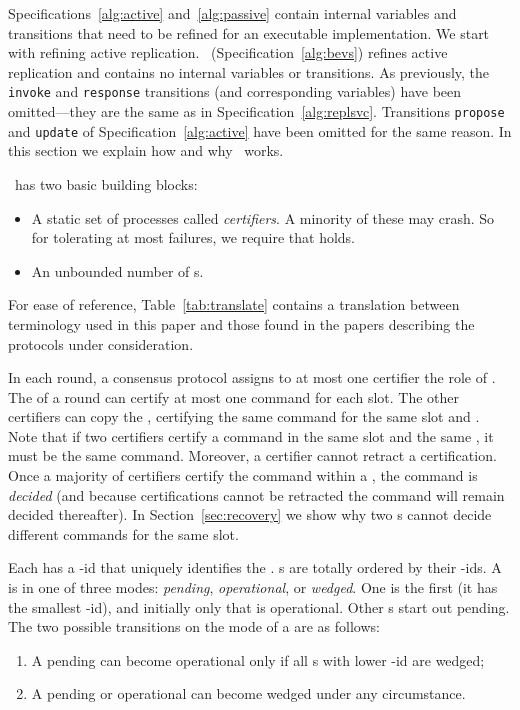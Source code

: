 \label{sec:bevs}

Specifications~\ref{alg:active} and~\ref{alg:passive} contain
internal variables and transitions
that need to be refined for an executable implementation.
We start with refining active replication.
\multiconsensus\
(Specification~\ref{alg:bevs}) refines active replication and contains
no internal variables or transitions.
As previously, the \texttt{invoke} and \texttt{response} transitions (and corresponding variables) have been
omitted---they are the same as in Specification~\ref{alg:replsvc}. Transitions
\texttt{propose} and \texttt{update} of Specification~\ref{alg:active} have been omitted for the same reason.
In this section we explain how and why \multiconsensus\ works.





\multiconsensus\ has two basic building blocks:
\begin{itemize}\item A static set of  processes called \emph{certifiers}.
A minority of these may crash.  So for tolerating at most 
failures, we require that  holds.
\item An unbounded number of \emph{{\round}}s.
\end{itemize}

\noindent
For ease of reference, Table~\ref{tab:translate}
contains a translation between terminology used in this paper
and those found in the papers describing the protocols under consideration.

In each round, a consensus protocol assigns to at most one certifier the role
of \emph{\sequencer}.
The {\sequencer} of a round can certify at most one command for each slot.
The other certifiers can copy the {\sequencer}, certifying the same
command for the same slot and {\round}.
Note that if two certifiers certify a command in the same
slot and the same {\round}, it must be the same command.
Moreover, a certifier cannot retract a certification.
Once a majority of certifiers certify
the command within a {\round}, the command is \emph{decided}
(and because certifications cannot be retracted the command will remain
decided thereafter).
In Section~\ref{sec:recovery} we show why
two {\round}s cannot decide different commands for the same slot.

Each {\round} has a {\round}-id that uniquely identifies the {\round}.
{\Round}s are totally ordered by their {\round}-ids.
A {\round} is in one of three modes: \emph{pending}, \emph{operational},
or \emph{wedged}.
One {\round} is the first {\round} (it has the smallest {\round}-id), and initially
only that {\round} is operational.  Other {\round}s start out pending.
The two possible transitions on the mode of a {\round} are as follows:
\begin{enumerate}\item A pending {\round} can become operational only if all {\round}s with
lower {\round}-id are wedged;
\item A pending or operational {\round} can become wedged under any
circumstance.
\end{enumerate}

